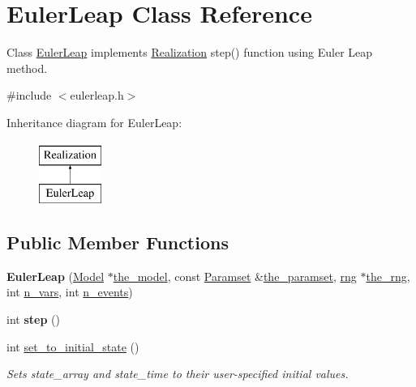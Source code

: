\hypertarget{class_euler_leap}{}\section{Euler\+Leap Class Reference}
\label{class_euler_leap}


Class \hyperlink{class_euler_leap}{Euler\+Leap} implements \hyperlink{class_realization}{Realization} step() function using Euler Leap method.  




{\ttfamily \#include $<$eulerleap.\+h$>$}

Inheritance diagram for Euler\+Leap\+:\begin{figure}[H]
\begin{center}
\leavevmode
\includegraphics[height=2.000000cm]{class_euler_leap}
\end{center}
\end{figure}
\subsection*{Public Member Functions}
\begin{DoxyCompactItemize}
\item 
\mbox{\label{class_euler_leap_ae5db6ea05659798b624a28872799b906}} 
{\bfseries Euler\+Leap} (\hyperlink{class_model}{Model} $\ast$\hyperlink{class_realization_a47ec1d062b8caee874b08c1a17d6aeeb}{the\+\_\+model}, const \hyperlink{class_paramset}{Paramset} \&\hyperlink{class_realization_a119bb29de88929bc51bc1b329473a94b}{the\+\_\+paramset}, \hyperlink{classrng}{rng} $\ast$\hyperlink{class_realization_ac8d358d929afae90cf5790675b6744f9}{the\+\_\+rng}, int \hyperlink{class_realization_ad9951a0829e68e12fcb3817735bb5097}{n\+\_\+vars}, int \hyperlink{class_realization_afb711282bef806fc0020f91252d1df2c}{n\+\_\+events})
\item 
\mbox{\label{class_euler_leap_a25b1ea90a95bfd41ecb919605683da9d}} 
int {\bfseries step} ()
\item 
int \hyperlink{class_euler_leap_a1a13929ea1ebf40e7357439968828f4b}{set\+\_\+to\+\_\+initial\+\_\+state} ()
\begin{DoxyCompactList}\small\item\em Sets state\+\_\+array and state\+\_\+time to their user-\/specified initial values. \end{DoxyCompactList}\end{DoxyCompactItemize}
